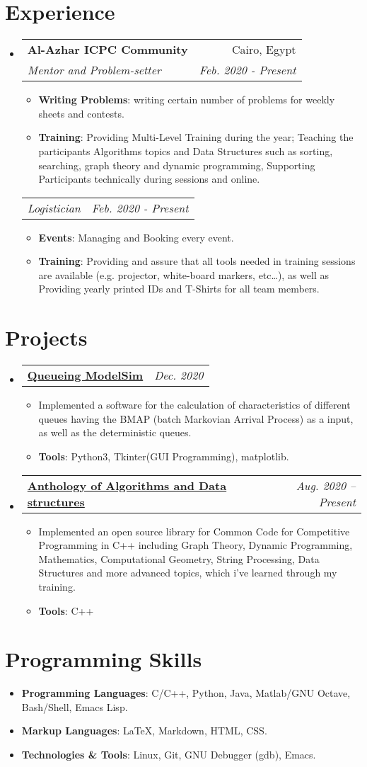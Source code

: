 \documentclass[letterpaper, 11pt]{article}
\makeatletter
\newcommand{\Item}[2]{\item\small{\textbf{#1}{#2 \vspace{-2pt}}}}
\newcommand{\SubSecListBeg}{\begin{itemize}[leftmargin=*]}
\newcommand{\SubSecListEnd}{\end{itemize}}
\newcommand{\ItemListBeg}{\begin{itemize}}
\newcommand{\ItemListEnd}{\end{itemize}\vspace{-5pt}}
\newcommand{\subsecfourtwoitalic}[4] {
	\vspace{-1pt}\item
	\begin{tabular*}{0.97\textwidth}[t]{l@{\extracolsep{\fill}}r}
		\textbf{#1} & #2 \\
		\textit{\small#3} & \textit{\small #4} \\
	\end{tabular*}\vspace{-5pt}
}
\newcommand{\subsubsectwoitalic}[2] {
	\begin{tabular*}{0.97\textwidth}{l@{\extracolsep{\fill}}r}
		\textit{\small#1} & \textit{\small #2} \\
	\end{tabular*}\vspace{-5pt}
}
\newcommand{\subsectwooneitalic}[2] {
	\vspace{-1pt}\item
	\begin{tabular*}{0.97\textwidth}[t]{l@{\extracolsep{\fill}}r}
		\textbf{#1} & \textit{\small #2} \\
	\end{tabular*}\vspace{-5pt}
}
\makeatother
\begin{document}
\section{Experience}
\SubSecListBeg
	\subsecfourtwoitalic
	{Al-Azhar ICPC Community}{Cairo, Egypt}
	{Mentor and Problem-setter}{Feb. 2020 - Present}
      	\ItemListBeg
        	\Item{Writing Problems}
        	{: writing certain number of problems for weekly sheets and contests.}
		\Item{Training}
		{: Providing Multi-Level Training during the year; Teaching the participants Algorithms topics and Data Structures such as sorting, searching, graph theory and dynamic programming, Supporting Participants technically during sessions and online.}
      	\ItemListEnd
	\subsubsectwoitalic
	{Logistician}{Feb. 2020 - Present}
	\ItemListBeg
        	\Item{Events}
        	{: Managing and Booking every event.}
        	\Item{Training}
          	{: Providing and assure that all tools needed in training sessions are available (e.g. projector, white-board markers, etc…), as well as Providing yearly printed IDs and T-Shirts for all team members.}
      	\ItemListEnd
\SubSecListEnd


\section{Projects}
\SubSecListBeg
	\subsectwooneitalic
	{\faIcon{user-clock} \href{https://github.com/AbdeltwabMF/Queueing-ModelSim}{Queueing ModelSim}}{Dec. 2020}
	\ItemListBeg
		\Item{}{Implemented a software for the calculation of characteristics of different queues having the BMAP (batch Markovian Arrival Process) as a input, as well as the deterministic queues.}
		\Item{Tools}
		{: Python3, Tkinter(GUI Programming), matplotlib.}
	\ItemListEnd

	\subsectwooneitalic
	{\faIcon{laptop-code} \href{https://github.com/AbdeltwabMF/Anthology-of-Algorithms-and-Data-structures}{Anthology of Algorithms and Data structures}}{Aug. 2020 -- Present}
	\ItemListBeg
		\Item{}{Implemented an open source library for Common Code for Competitive Programming in C++ including Graph Theory, Dynamic Programming, Mathematics, Computational Geometry, String Processing, Data Structures and more advanced topics, which i've learned through my training.}
		\Item{Tools}
		{: C++}
	\ItemListEnd
\SubSecListEnd

\section{Programming Skills}
\SubSecListBeg
	\Item{Programming Languages}{: C/C++, Python, Java, Matlab/GNU Octave, Bash/Shell, Emacs Lisp.}
	\Item{Markup Languages}{: \LaTeX, Markdown, HTML, CSS.}
	\Item{Technologies \& Tools}{: Linux, Git, GNU Debugger (gdb), Emacs.}
\SubSecListEnd
\end{document}
